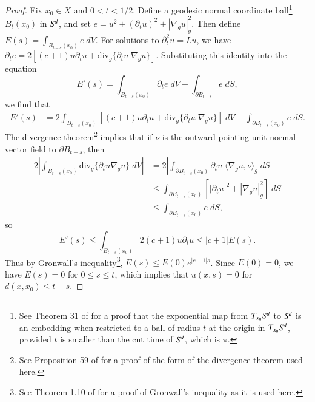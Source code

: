 \begin{proof}
  Fix $x_0 \in X$ and $0 < t < 1/2$. Define a geodesic normal coordinate ball\footnote{See Theorem 31 of \cite{spivakvol4} for a proof that the exponential map from $T_{x_0} {S}^{\!{d}}$ to ${S}^{\!{d}}$ is an embedding when restricted to a ball of radius $t$ at the origin in $T_{x_0} {S}^{\!{d}}$, provided $t$ is smaller than the cut time of ${S}^{\!{d}}$, which is $\pi$.} $B_t(x_0)$ in ${S}^{\!{d}}$, and set $e = u^2 + (\partial_t u)^2 + |\nabla_g u|_g^2$. Then define $E(s) = \int_{B_{t-s}(x_0)} e\; dV$. For solutions to $\partial_t^2 u = Lu$, we have $\partial_t e = 2[ (c + 1) u \partial_t u + \text{div}_g \{ \partial_t u\; \nabla_g u \} ]$.
  Substituting this identity into the equation
  \begin{equation}
    E'(s) = \int_{B_{t-s}(x_0)} \partial_t e\; dV - \int_{\partial B_{t-s}} e\; dS,
  \end{equation}
  we find that
  \begin{equation}
  \begin{split}
    E'(s) &= 2 \int_{B_{t-s}(x_0)} [(c+1) u \partial_t u + \text{div}_g \{ \partial_t u\; \nabla_g u \}]\; dV - \int_{\partial B_{t-s}(x_0)} e\; dS.
  \end{split}
  \end{equation}
  The divergence theorem\footnote{See Proposition 59 of \cite{spivakvol4} for a proof of the form of the divergence theorem used here.} implies that if $\nu$ is the outward pointing unit normal vector field to $\partial B_{t-s}$, then
  \begin{equation}
  \begin{split}
    2 \left| \int_{B_{t-s}(x_0)} \text{div}_g \{ \partial_t u \nabla_g u \}\; dV \right| &= 2 \left| \int_{\partial B_{t-s}(x_0)} \partial_t u\;\! \langle \nabla_g u, \nu \rangle_g\; dS \right|\\
    &\leq \int_{\partial B_{t-s}(x_0)} [|\partial_t u|^2 + |\nabla_g u|_g^2]\; dS\\
    &\leq \int_{\partial B_{t-s}(x_0)} e\; dS,
  \end{split}
  \end{equation}
  so
  \begin{equation}
    E'(s) \leq \int_{B_{t-s}(x_0)} 2(c+1) u \partial_t u \leq |c + 1| E(s).
  \end{equation}
  Thus by Gronwall's inequality\footnote{See Theorem 1.10 of \cite{TaoDispersive} for a proof of Gronwall's inequality as it is used here.}, $E(s) \leq E(0) e^{|c+1|s}$. Since $E(0) = 0$, we have $E(s) = 0$ for $0 \leq s \leq t$, which implies that $u(x,s) = 0$ for $d(x,x_0) \leq t - s$.
\end{proof}

